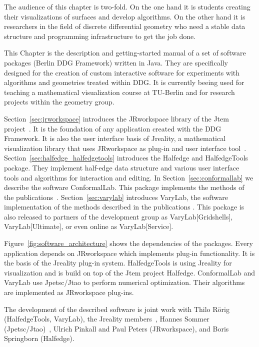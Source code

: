 The audience of this chapter is two-fold. On the one hand it is students creating their 
visualizations of surfaces and develop algorithms. On the other hand it is researchers in the
field of discrete differential geometry who need a stable data structure and programming
infrastructure to get the job done.

This Chapter is the description and getting-started manual of a set of software packages
(Berlin DDG Framework) written in Java. They are specifically designed for the creation of
custom interactive software for experiments with algorithms and geometries treated 
within DDG. It is currently beeing used for teaching a mathematical visualization course at 
TU-Berlin \cite{VisMathHomepage} and for research projects within the geometry group.

Section~\ref{sec:jrworkspace} introduces the {\sc JRworkspace} library of the 
{\sc Jtem} project~\cite{JtemWebsite}. It is the foundation of any application created with 
the DDG Framework. It is also the user interface basis of {\sc Jreality}, a mathematical 
visualization library that uses {\sc JRworkspace} as plug-in and user interface 
tool~\cite{JrealityWebsite}. Section~\ref{sec:halfedge_halfedgetools} introduces the 
{\sc Halfedge} and {\sc HalfedgeTools} package. They implement half-edge data 
structure and various user interface tools and algorithms for interaction and editing.  
In Section~\ref{sec:conformallab} we describe the software 
{\sc ConformalLab}. This package implements the methods of the 
publications~\cite{Bobenko2010, OWR2012, Sechelmann2012, BobSechSpr}.
Section~\ref{sec:varylab} introduces {\sc VaryLab}, the software implementation of the 
methods described in the publications \cite{Lafuente2011, Lafuente2012, Sechelmann2012}.
This package is also released to partners of the development group as {\sc VaryLab[Gridshells]},
{\sc VaryLab[Ultimate]}, or even online as {\sc VaryLab[Service]}.

Figure~\ref{fig:software_architecture} shows the dependencies of the packages. Every
application depends on {\sc JRworkspace} which implements plug-in functionality. It is
the basis of the {\sc Jreality} plug-in system. {\sc Half\-edge\-Tools} is using {\sc Jreality} 
for visualization and is build on top of the {\sc Jtem} project {\sc Half\-edge}. 
{\sc ConformalLab} and {\sc VaryLab} use {\sc Jpetsc/Jtao} to perform numerical
optimization. Their algorithms are implemented as {\sc JRworkspace} plug-ins.

The development of the described software is joint work with Thilo R{\" o}rig 
({\sc HalfedgeTools, VaryLab}), the {\sc Jreality} members~\cite{JrealityWebsite}, Hannes 
Sommer ({\sc Jpetsc/Jtao})~\cite{jpetsctao-web-page}, Ulrich Pinkall and Paul Peters 
({\sc JRworkspace}), and Boris Springborn ({\sc Halfedge}).



